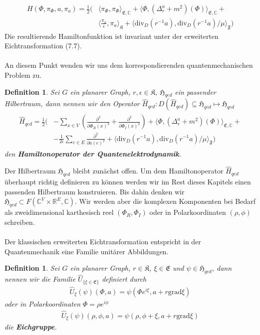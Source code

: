 \documentclass[11pt,a4paper,leqno]{report}
\newtheorem{definition}[theorem]{Definition}
\numberwithin{equation}{chapter}
\begin{document}
\begin{align*}
	H(\Phi, \pi_\Phi, a, \pi_a) = \frac{1}{2}(&\langle \pi_\Phi, \pi_\Phi\rangle_{\mathfrak{E},\mathbb{C}}+\langle \Phi, (\Delta_r^a + m^2)(\Phi)\rangle_{\mathfrak{E},\mathbb{C}}+\\ &\langle \frac{\pi_a}{\epsilon}, \pi_a\rangle_{\mathfrak{K}} + \langle \text{div}_D(r^{-1}a), \text{div}_D(r^{-1}a)/\mu\rangle_{\mathfrak{F}}) 
\end{align*}
Die resultierende Hamiltonfunktion ist invariant unter der erweiterten Eichtransformation (7.7). \\
\\
An diesem Punkt wenden wir uns dem korrespondierenden quantenmechanischen Problem zu.
\begin{definition}
	Sei $G$ ein planarer Graph, $r,\epsilon\in\mathfrak{K}$, $\mathfrak{H}_{qed}$ ein passender Hilbertraum, dann nennen wir den Operator $\hat{H}_{qed}:D(\hat{H}_{qed})\subseteq\mathfrak{H}_{qed}\mapsto\mathfrak{H}_{qed}$
	\begin{align}
		\begin{split}
		\hat{H}_{qed} = \frac{1}{2}(&-\sum_{x\in V}(\frac{\partial^2}{\partial\Phi_R(x)^2} +\frac{\partial^2}{\partial\Phi_I(x)^2})+\langle \Phi, (\Delta_r^a + m^2)(\Phi)\rangle_{\mathfrak{E},\mathbb{C}}+\\ &-\frac{1}{2\epsilon}\sum_{e\in E}\frac{\partial^2}{\partial a(e)^2} + \langle \text{div}_D(r^{-1}a), \text{div}_D(r^{-1}a)/\mu\rangle_{\mathfrak{F}}) 
		\end{split}	
	\end{align}
	den \textbf{Hamiltonoperator der Quantenelektrodynamik}.
\end{definition}
\noindent
Der Hilbertraum $\mathfrak{H}_{qed}$ bleibt zun\"achst offen. Um dem Hamiltonoperator $\hat{H}_{qed}$ \"uberhaupt richtig definieren zu k\"onnen werden wir im Rest dieses Kapitels einen passenden Hilbertraum konstruieren. Bis dahin denken wir $\mathfrak{H}_{qed}\subset F(\mathbb{C}^V\times\mathbb{R}^E,\mathbb{C})$. Wir werden aber die komplexen Komponenten bei Bedarf als zweidimensional karthesisch reel $(\Phi_R,\Phi_I)$ oder in Polarkoordinaten $(\rho,\phi)$ schreiben.\\
\\
Der klassischen erweiterten Eichtransformation entspricht in der Quantenmechanik eine Familie unit\"arer Abbildungen.
\begin{definition}
	Sei $G$ ein planarer Graph, $r\in\mathfrak{K}$, $\xi\in \mathfrak{E}$ und $\psi\in\mathfrak{H}_{qed}$,  dann nennen wir die Familie $\hat{U}_{\{\xi\in \mathfrak{E}\}}$ definiert durch
	\begin{align}
		\hat{U}_\xi(\psi)(\Phi, a) =  \psi(\Phi e^{i\xi}, a + r \text{grad}\xi)
	\end{align}
    oder in Polarkoordinaten $\Phi = \rho e^{i\phi}$
    \begin{align}
    	\hat{U}_\xi(\psi)(\rho, \phi, a) =  \psi(\rho, \phi + \xi, a + r \text{grad}\xi)
    \end{align}
	die \textbf{Eichgruppe}.
\end{definition}
\end{document}
